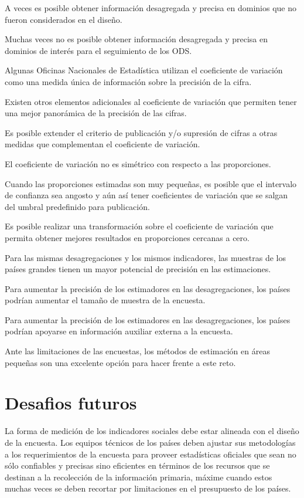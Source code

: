 \documentclass[12pt,spanish,]{book}
\begin{document}
A veces es posible obtener información desagregada y precisa en dominios que no fueron considerados en el diseño.

Muchas veces no es posible obtener información desagregada y precisa en dominios de interés para el seguimiento de los ODS.

Algunas Oficinas Nacionales de Estadística utilizan el coeficiente de variación como una medida única de información sobre la precisión de la cifra.

Existen otros elementos adicionales al coeficiente de variación que permiten tener una mejor panorámica de la precisión de las cifras.

Es posible extender el criterio de publicación y/o supresión de cifras a otras medidas que complementan el coeficiente de variación.

El coeficiente de variación no es simétrico con respecto a las proporciones.

Cuando las proporciones estimadas son muy pequeñas, es posible que el intervalo de confianza sea angosto y aún así tener coeficientes de variación que se salgan del umbral predefinido para publicación.

Es posible realizar una transformación sobre el coeficiente de variación que permita obtener mejores resultados en proporciones cercanas a cero.

Para las mismas desagregaciones y los mismos indicadores, las muestras de los países grandes tienen un mayor potencial de precisión en las estimaciones.

Para aumentar la precisión de los estimadores en las desagregaciones, los países podrían aumentar el tamaño de muestra de la encuesta.

Para aumentar la precisión de los estimadores en las desagregaciones, los países podrían apoyarse en información auxiliar externa a la encuesta.

Ante las limitaciones de las encuestas, los métodos de estimación en áreas pequeñas son una excelente opción para hacer frente a este reto.

\hypertarget{desafios-futuros}{%
\chapter{Desafios futuros}\label{desafios-futuros}}

La forma de medición de los indicadores sociales debe estar alineada con el diseño de la encuesta. Los equipos técnicos de los países deben ajustar sus metodologías a los requerimientos de la encuesta para proveer estadísticas oficiales que sean no sólo confiables y precisas sino eficientes en términos de los recursos que se destinan a la recolección de la información primaria, máxime cuando estos muchas veces se deben recortar por limitaciones en el presupuesto de los países.
\end{document}
